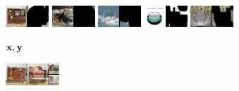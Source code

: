 \newcommand{\imagenetimgheight}{0.8cm}
  \begin{figure}[t]
    \centering
    \begin{subfigure}[t]{0.15\textwidth}
      \centering
      \includegraphics[height=\imagenetimgheight]{figs/cigcvae/image-samples/imagenet64/freeform_aipo_0_gt_masked.png}
      \includegraphics[height=\imagenetimgheight]{figs/cigcvae/image-samples/imagenet64/freeform_aipo_1_gt_masked.png}
      \includegraphics[height=\imagenetimgheight]{figs/cigcvae/image-samples/imagenet64/freeform_aipo_2_gt_masked.png}
      \includegraphics[height=\imagenetimgheight]{figs/cigcvae/image-samples/imagenet64/freeform_aipo_3_gt_masked.png}
      \includegraphics[height=\imagenetimgheight]{figs/cigcvae/image-samples/imagenet64/freeform_aipo_4_gt_masked.png}
      \caption{${\mathbf{x}}, {\mathbf{y}}$}
    \end{subfigure}
    \begin{subfigure}[t]{0.2\textwidth}
      \centering
      \includegraphics[height=\imagenetimgheight]{figs/cigcvae/image-samples/imagenet64/freeform_aipo_0_t=0.85_samples.png}

\end{subfigure}
\end{figure}
